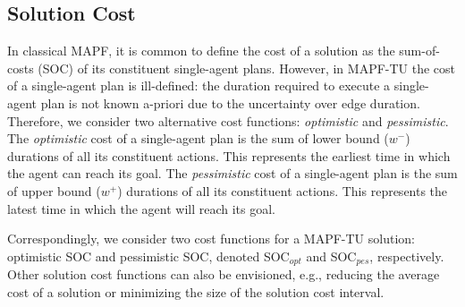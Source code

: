 \documentclass[jair,twoside,11pt,theapa]{article}
\newcommand{\timel}{w^-}
\newcommand{\timeu}{w^+}
\newcommand{\mapftu}{MAPF-TU\xspace}
\newcommand{\socopt}{SOC$_{opt}$\xspace}
\newcommand{\socpes}{SOC$_{pes}$\xspace}
\newtheorem{example}{Example}
\begin{document}



\subsection{Solution Cost}
In classical MAPF, it is common to define the cost of a solution as the sum-of-costs (SOC) of its constituent single-agent plans. 
However, in \mapftu the cost of a single-agent plan is ill-defined: 
the duration required to execute a single-agent plan is not known a-priori due to the uncertainty over edge duration. 
Therefore, we consider two alternative cost functions: \emph{optimistic} and \emph{pessimistic}. 
The \emph{optimistic} cost of a single-agent plan is the sum of 
lower bound ($\timel$) durations of all its constituent actions. 
This represents the earliest time in which the agent can reach its goal. 
The \emph{pessimistic} cost of a single-agent plan is the sum of 
upper bound ($\timeu$) durations of all its constituent actions. 
This represents the latest time in which the agent will reach its goal. 


Correspondingly, we consider two cost functions for a \mapftu solution: optimistic SOC and pessimistic SOC, 
denoted \socopt and \socpes, respectively. 
Other solution cost functions can also be envisioned, e.g., reducing the average cost of a solution or minimizing the size of the solution cost interval. 
\end{document}
